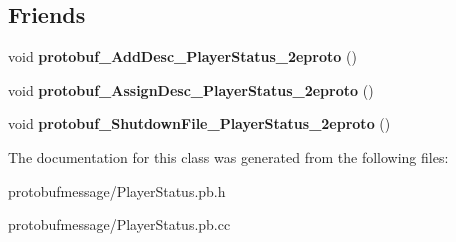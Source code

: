 \subsection*{Friends}
\begin{DoxyCompactItemize}
\item 
\hypertarget{class_player_status_a290128592e152c8359d6cbd8ddcf6149}{void {\bfseries protobuf\-\_\-\-Add\-Desc\-\_\-\-Player\-Status\-\_\-2eproto} ()}\label{class_player_status_a290128592e152c8359d6cbd8ddcf6149}

\item 
\hypertarget{class_player_status_a94feb01d8332b50adabb4d789258c0cc}{void {\bfseries protobuf\-\_\-\-Assign\-Desc\-\_\-\-Player\-Status\-\_\-2eproto} ()}\label{class_player_status_a94feb01d8332b50adabb4d789258c0cc}

\item 
\hypertarget{class_player_status_a8f9c4c72438a0dd5519155e999949dfc}{void {\bfseries protobuf\-\_\-\-Shutdown\-File\-\_\-\-Player\-Status\-\_\-2eproto} ()}\label{class_player_status_a8f9c4c72438a0dd5519155e999949dfc}

\end{DoxyCompactItemize}


The documentation for this class was generated from the following files\-:\begin{DoxyCompactItemize}
\item 
protobufmessage/Player\-Status.\-pb.\-h\item 
protobufmessage/Player\-Status.\-pb.\-cc\end{DoxyCompactItemize}
